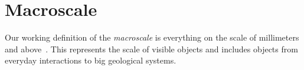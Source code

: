 









\section{Macroscale}\label{sec:macroscale}
Our working definition of the \textit{macroscale} is everything on the scale of millimeters and above~\cite{HUNG2015215}. This represents the scale of visible objects and includes objects from everyday interactions to big geological systems. 

